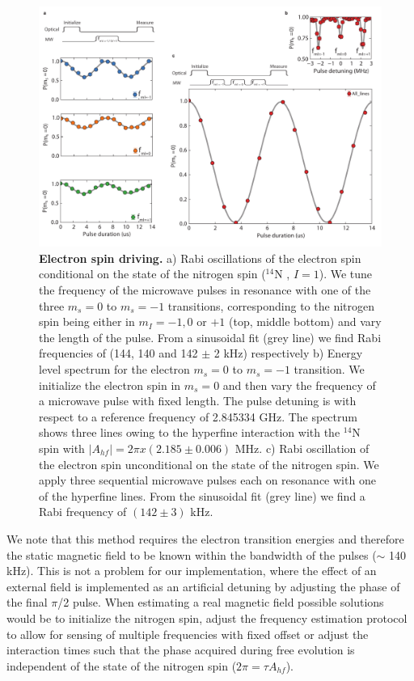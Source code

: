 \documentclass{report}
\begin{document}
\begin{figure}[h]
	\centering
	\includegraphics[width=12cm]{figures/Rabi_diff_hf_lines}
	\caption{\label{fig:ammS7} \textbf{Electron spin driving.} a) Rabi oscillations of the electron spin conditional on the state of the  nitrogen spin ($^{14}$N , $I = 1$). We tune the frequency of the microwave pulses in resonance with one of the three $m_s = 0$ to $m_s = -1$ transitions, corresponding to the nitrogen spin being either in $m_I = -1 , 0$ or $+1$ (top, middle bottom) and vary the length of the pulse. From a sinusoidal fit (grey line) we find Rabi frequencies of  (144, 140 and 142 $\pm$ 2 kHz) respectively b) Energy level spectrum for the electron $m_s = 0$ to $m_s = -1$ transition. We initialize the electron spin in $m_s = 0$ and then vary the frequency of a microwave pulse with fixed length. The pulse detuning is with respect to a reference frequency of 2.845334 GHz.  The spectrum shows three lines owing to the hyperfine interaction with the $^{14}$N spin with $|A_{hf}| = 2\pi x (2.185  \pm 0.006)$ MHz. c) Rabi oscillation of the electron spin unconditional on the state of the nitrogen spin. We apply three sequential microwave pulses each on resonance with one of the hyperfine lines. From the sinusoidal fit (grey line) we find a Rabi frequency of $(142 \pm 3)$ kHz.}
\end{figure}

We note that this method requires the electron transition energies and therefore the static magnetic field to be known within the bandwidth of the pulses ($\sim$ 140 kHz). This is not a problem for our implementation, where the effect of an external field is implemented as an artificial detuning by adjusting the phase of the final $\pi$/2 pulse. When estimating a real magnetic field possible solutions would be to initialize the nitrogen spin, adjust the frequency estimation protocol to allow for sensing of multiple frequencies with fixed offset or adjust the interaction times such that the phase acquired during free evolution is independent of the state of the nitrogen spin ($2 \pi = \tau A_{hf}$).
\end{document}
